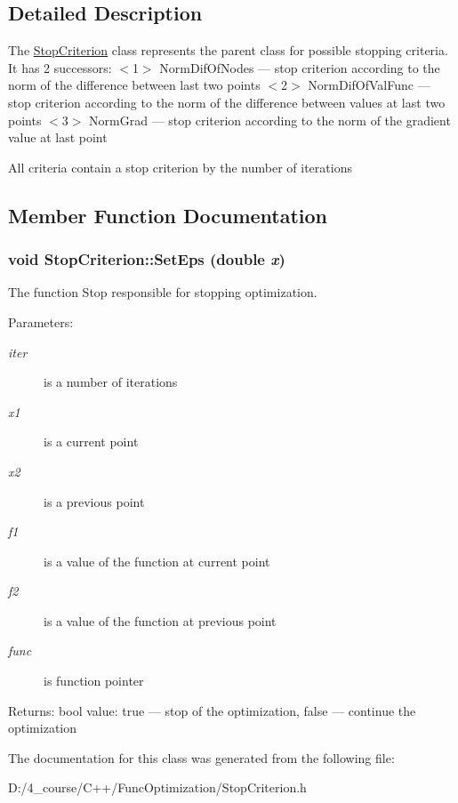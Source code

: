 \subsection{Detailed Description}
The \hyperlink{class_stop_criterion}{StopCriterion} class represents the parent class for possible stopping criteria. It has 2 successors: $<$1$>$ NormDifOfNodes --- stop criterion according to the norm of the difference between last two points $<$2$>$ NormDifOfValFunc --- stop criterion according to the norm of the difference between values at last two points $<$3$>$ NormGrad --- stop criterion according to the norm of the gradient value at last point

All criteria contain a stop criterion by the number of iterations 

\subsection{Member Function Documentation}
\hypertarget{class_stop_criterion_4d4190f91f16897f4dba141f62f421ac}{
\subsubsection[{SetEps}]{\setlength{\rightskip}{0pt plus 5cm}void StopCriterion::SetEps (double {\em x})}}
\label{class_stop_criterion_4d4190f91f16897f4dba141f62f421ac}


The function Stop responsible for stopping optimization.

\begin{Desc}
\item[Parameters:]
\begin{description}
\item[{\em iter}]is a number of iterations \item[{\em x1}]is a current point \item[{\em x2}]is a previous point \item[{\em f1}]is a value of the function at current point \item[{\em f2}]is a value of the function at previous point \item[{\em func}]is function pointer \end{description}
\end{Desc}
\begin{Desc}
\item[Returns:]bool value: true --- stop of the optimization, false --- continue the optimization \end{Desc}


The documentation for this class was generated from the following file:\begin{CompactItemize}
\item 
D:/4\_\-course/C++/FuncOptimization/StopCriterion.h\end{CompactItemize}
